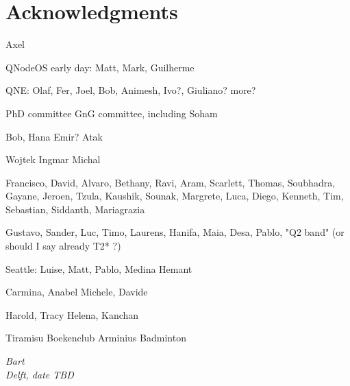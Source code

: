 \chapter*{Acknowledgments}

\todo{}
Axel

QNodeOS early day: Matt, Mark, Guilherme

QNE: Olaf, Fer, Joel, Bob, Animesh, Ivo?, Giuliano? more?

PhD committee
GnG committee, including Soham

Bob, Hana
Emir?
Atak

Wojtek
Ingmar
Michal

Francisco, David, Alvaro, Bethany, Ravi, Aram, Scarlett, Thomas, Soubhadra, Gayane, Jeroen, Tzula, Kaushik, Sounak, Margrete, Luca, Diego, Kenneth, Tim, Sebastian, Siddanth, 
Mariagrazia

Gustavo, Sander, Luc, Timo, Laurens, Hanifa, Maia, Desa, Pablo, "Q2 band" (or should I say already T2* ?)

Seattle: Luise, Matt, Pablo, Medina
Hemant

Carmina, Anabel
Michele, Davide

Harold, Tracy
Helena, Kanchan

Tiramisu
Boekenclub
Arminius
Badminton


\begin{flushright}
{\itshape
Bart \\
Delft, date TBD
}
\end{flushright}
